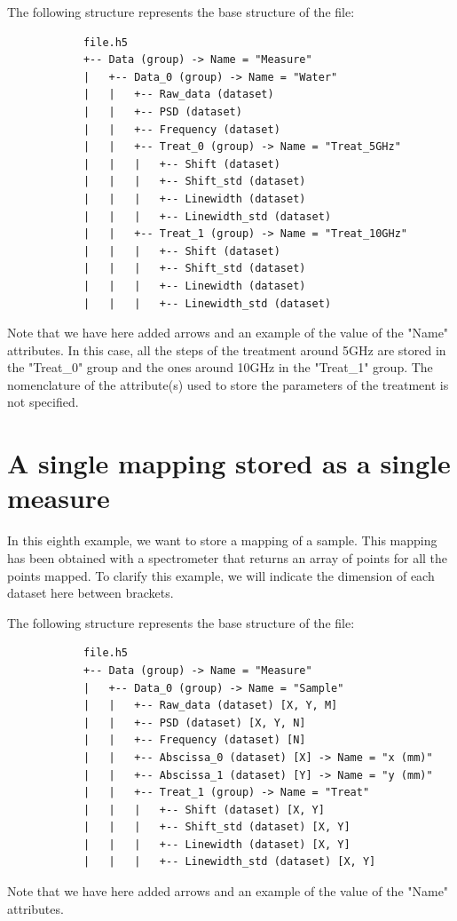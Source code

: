 \documentclass{book}
\begin{document}
        The following structure represents the base structure of the file:
        \begin{verbatim}
            file.h5
            +-- Data (group) -> Name = "Measure"
            |   +-- Data_0 (group) -> Name = "Water"
            |   |   +-- Raw_data (dataset)
            |   |   +-- PSD (dataset)
            |   |   +-- Frequency (dataset)
            |   |   +-- Treat_0 (group) -> Name = "Treat_5GHz"
            |   |   |   +-- Shift (dataset)
            |   |   |   +-- Shift_std (dataset)
            |   |   |   +-- Linewidth (dataset)
            |   |   |   +-- Linewidth_std (dataset)
            |   |   +-- Treat_1 (group) -> Name = "Treat_10GHz"
            |   |   |   +-- Shift (dataset)
            |   |   |   +-- Shift_std (dataset)
            |   |   |   +-- Linewidth (dataset)
            |   |   |   +-- Linewidth_std (dataset)
        \end{verbatim}
        Note that we have here added arrows and an example of the value of the "Name" attributes.
        In this case, all the steps of the treatment around 5GHz are stored in the "Treat\_0" group and the ones around 10GHz in the "Treat\_1" group. The nomenclature of the attribute(s) used to store the parameters of the treatment is not specified.

    \section{A single mapping stored as a single measure}
        In this eighth example, we want to store a mapping of a sample. This mapping has been obtained with a spectrometer that returns an array of points for all the points mapped. To clarify this example, we will indicate the dimension of each dataset here between brackets.

        The following structure represents the base structure of the file:
        \begin{verbatim}
            file.h5
            +-- Data (group) -> Name = "Measure"
            |   +-- Data_0 (group) -> Name = "Sample"
            |   |   +-- Raw_data (dataset) [X, Y, M]
            |   |   +-- PSD (dataset) [X, Y, N]
            |   |   +-- Frequency (dataset) [N]
            |   |   +-- Abscissa_0 (dataset) [X] -> Name = "x (mm)"
            |   |   +-- Abscissa_1 (dataset) [Y] -> Name = "y (mm)"
            |   |   +-- Treat_1 (group) -> Name = "Treat"
            |   |   |   +-- Shift (dataset) [X, Y]
            |   |   |   +-- Shift_std (dataset) [X, Y]
            |   |   |   +-- Linewidth (dataset) [X, Y]
            |   |   |   +-- Linewidth_std (dataset) [X, Y]
        \end{verbatim}
        Note that we have here added arrows and an example of the value of the "Name" attributes.
    
\end{document}
